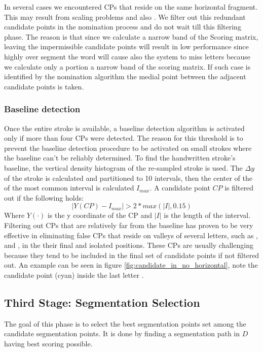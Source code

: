 \documentclass[journal,compsoc]{IEEEtran}
\begin{document}
In several cases we encountered CPs that reside on the same horizontal fragment. This may result from scaling problems and also  . We filter out this redundant candidate points in the nomination process and do not wait till this filtering phase. The reason is that since we calculate a narrow band of the Scoring matrix, leaving the impermissible candidate points will result in low performance since highly over segment the word will cause also the system to miss letters because we calculate only a portion a narrow band of the scoring matrix. If such case is identified by the nomination algorithm the medial point between the adjacent candidate points is taken.\\

\subsubsection{Baseline detection}
Once the entire stroke is available, a baseline detection algorithm is activated only if more than four CPs were detected. The reason for this threshold is to prevent the baseline detection procedure to be activated on small strokes where the baseline can't be reliably determined. To find the handwritten stroke's baseline, the vertical density histogram of the re-sampled stroke is used. The $\Delta y$ of the stroke is calculated and partitioned to 10 intervals, then the center of the of the most common interval is calculated $I_{max}$. A candidate point $CP$ is filtered out if the following holds:
\begin{equation}
\left|Y\left(CP\right)-I_{max}\right|>2*max{\left({\left|I\right|},0.15\right)} 
\end{equation}
Where $Y(\cdot)$ is the y coordinate of the CP and $|I|$ is the length of the interval. 
Filtering out CPs that are relatively far from the baseline has proven to be very effective in eliminating false CPs that reside on valleys of several letters, such as ,  and , in the their final and isolated positions. These CPs are usually challenging because they tend to be included in the final set of candidate points if not filtered out. An example can be seen in figure \ref{fig:candidate_in_no_horizontal}, note the candidate point (cyan) inside the last letter . 

\subsection{Third Stage: Segmentation Selection}
The goal of this phase is to select the best segmentation points set among the candidate segmentation points. It is done by finding a segmentation path in $D$ having best scoring possible. 
 
\end{document}
